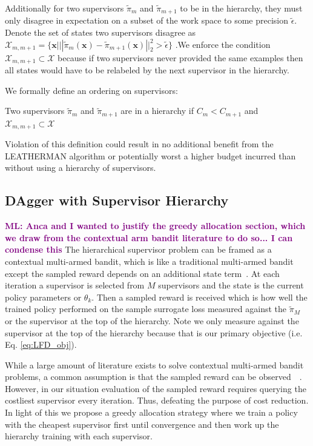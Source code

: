 \documentclass[10pt, conference]{ieeeconf}      %
\newenvironment{definition}[1][Definition]{\begin{trivlist}
\item[\hskip \labelsep {\bfseries #1}]}{\end{trivlist}}
\newcommand{\mlnote}[1]{\ifthenelse{ \boolean{include-notes}}%
 {\textcolor{purple}{\textbf{ML: #1}}}{}}
\begin{document}
Additionally for two supervisors $\tilde{\pi}_m$ and $\tilde{\pi}_{m+1}$ to be in the hierarchy, they must only disagree in expectation on a subset of the work space to some precision $\tilde{\epsilon}$. Denote the set of states two supervisors disagree as $\mathcal{X}_{m,m+1} = \lbrace \mathbf{x} | ||\tilde{\pi}_m(\mathbf{x}) - \tilde{\pi}_{m+1}(\mathbf{x}) ||^2_2 > \tilde{\epsilon} \rbrace$ .We enforce the condition $\mathcal{X}_{m,m+1} \subset \mathcal{X}$ because if two supervisors never provided the same examples then all states would have to be relabeled by the next supervisor in the hierarchy. 

We formally define an ordering on supervisors:

\begin{definition} Two supervisors $\tilde{\pi}_m$ and $\tilde{\pi}_{m+1}$ are in a hierarchy if  $C_m < C_{m+1}$  and  $\mathcal{X}_{m,m+1} \subset \mathcal{X}$
\end{definition}

Violation of this definition could result in no additional benefit from the LEATHERMAN algorithm or potentially worst a higher budget incurred than without using a hierarchy of supervisors.

\subsection{DAgger with Supervisor Hierarchy}
\mlnote{Anca and I wanted to justify the greedy allocation section, which we draw from the contextual arm bandit literature to do so... I can condense this}
The hierarchical supervisor problem can be framed as a contextual multi-armed bandit, which is like a traditional multi-armed bandit except the sampled reward depends on an additional state term~\cite{li2010contextual}. At each iteration a supervisor is selected from $M$ supervisors  and the state is the current policy parameters or $\theta_k$. Then a sampled reward is received which is how well the trained policy performed on the sample surrogate loss measured against the $\tilde{\pi}_M$ or the supervisor at the top of the hierarchy. Note we only measure against the supervisor at the top of the hierarchy because that is our primary objective (i.e. Eq. \ref{eq:LFD_obj}). 

While a large amount of literature exists to solve contextual multi-armed bandit problems, a common assumption is that the sampled reward can be observed~~\cite{li2010contextual}. However, in our situation evaluation of the sampled reward requires querying the costliest supervisor every iteration. Thus, defeating the purpose of cost reduction. In light of this we propose a greedy allocation strategy where we train a policy with the cheapest supervisor first until convergence and then work up the hierarchy training with each supervisor. 
\end{document}
